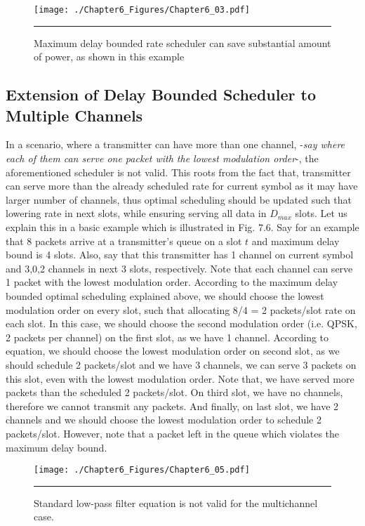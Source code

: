 \begin{figure}[htbp]
  \centering
    \texttt{[image: ./Chapter6\_Figures/Chapter6\_03.pdf]}
    \rule{35em}{0.5pt}
  \caption[Maximum delay bounded rate scheduler example]{Maximum delay bounded rate scheduler can save substantial amount of power, as shown in this example} 
  \label{fig:Electron}
\end{figure}

\subsection{Extension of Delay Bounded Scheduler to Multiple Channels}

In a scenario, where a transmitter can have more than one channel, -\textit{say where each of them can serve one packet with the lowest modulation order}-, the aforementioned scheduler is not valid. This roots from the fact that, transmitter can serve more than the already scheduled rate for current symbol as it may have larger number of channels, thus optimal scheduling should be updated such that lowering rate in next slots, while ensuring serving all data in $D_{max}$ slots. Let us explain this in a basic example which is illustrated in Fig. 7.6. Say for an example that 8 packets arrive at a transmitter's  queue on a slot $t$ and maximum delay bound is 4 slots. Also, say that this transmitter has 1 channel on current symbol and 3,0,2 channels in next 3 slots, respectively. Note that each channel can serve 1 packet with the lowest modulation order. According to the maximum delay bounded optimal scheduling explained above, we should choose the lowest modulation order on every slot, such that allocating 8/4 = 2 packets/slot rate on each slot. In this case, we should choose the second modulation order (i.e. QPSK, 2 packets per channel) on the first slot, as we have 1 channel. According to equation, we should choose the lowest modulation order on second slot, as we should schedule 2 packets/slot and we have 3 channels, we can serve 3 packets on this slot, even with the lowest modulation order. Note that, we have served more packets than the scheduled 2 packets/slot. On third slot, we have no channels, therefore we cannot transmit any packets. And finally, on last slot, we have 2 channels and we should choose the lowest modulation order to schedule 2 packets/slot. However, note that a packet left in the queue which violates the maximum delay bound. 


\begin{figure}[htbp]
  \centering
    \texttt{[image: ./Chapter6\_Figures/Chapter6\_05.pdf]}
    \rule{35em}{0.5pt}
  \caption[Standard low-pass filter equation is not valid for the multichannel case]{Standard low-pass filter equation is not valid for the multichannel case.} 
  \label{fig:Electron}
\end{figure}

